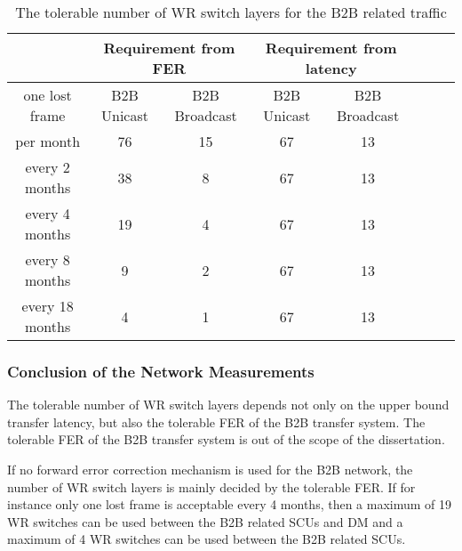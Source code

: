 \begin{table}[!htb]
\newcommand{\tabincell}[2]{\begin{tabular}{@{}#1@{}}#2\end{tabular}}
\caption{The tolerable number of WR switch layers for the B2B related traffic}
\label{tolerable_num}
\begin{center}
    \begin{tabular}{ | c |c | c | c | c | c | c | c |}
    \hline
                   & \multicolumn{2}{|c|}{Requirement from FER} & \multicolumn{2}{|c|}{Requirement from latency} \\ \hline
    one lost frame	& B2B Unicast & B2B Broadcast & B2B Unicast & B2B Broadcast \\ \hline
	 per month		&  \cellcolor{gray}76		&  \cellcolor{gray}15            & 67          & 13            \\ \hline 
	 every 2 months	& 38	 & 8   & \cellcolor{gray}67 & \cellcolor{gray}13            \\ \hline 
	 every 4 months	& 19 	 & 4   & \cellcolor{gray}67 & \cellcolor{gray}13            \\ \hline 
	 every 8 months	& 9 	 & 2   & \cellcolor{gray}67 & \cellcolor{gray}13            \\ \hline 
	 every 18 months& 4 	 & 1   & \cellcolor{gray}67 & \cellcolor{gray}13            \\ \hline 
    \end{tabular}
\end{center}
\end{table}

% 


\subsubsection{Conclusion of the Network Measurements}
The tolerable number of WR switch layers depends not only on the upper bound transfer latency, but also the tolerable FER of the B2B transfer system. The tolerable FER of the B2B transfer system is out of the scope of the dissertation. 

If no forward error correction mechanism is used for the B2B network, the number of WR switch layers is mainly decided by the tolerable FER. If for instance only one lost frame is acceptable every 4 months, then a maximum of 19 WR switches can be used between the B2B related SCUs and DM and a maximum of 4 WR switches can be used between the B2B related SCUs.


